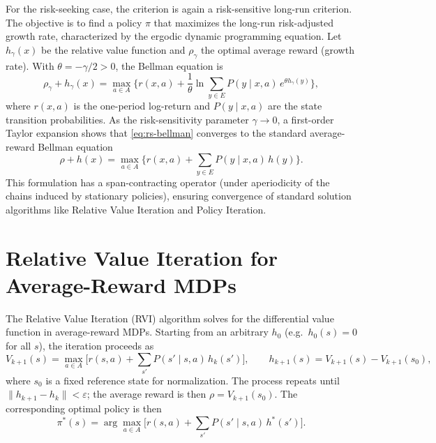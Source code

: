 \documentclass[11pt,a4paper]{article}
\begin{document}
For the risk-seeking case, the criterion is again a risk-sensitive long-run criterion. The objective is to find a policy $\pi$ that maximizes the long-run risk-adjusted growth rate, characterized by the ergodic dynamic programming equation. Let $h_\gamma(x)$ be the relative value function and $\rho_\gamma$ the optimal average reward (growth rate). With $\theta=-\gamma/2>0$, the Bellman equation is
\begin{equation}\label{eq:rs-bellman}
  \rho_\gamma+h_\gamma(x)=\max_{a\in A}\Big\{r(x,a)+\frac{1}{\theta}\ln\sum_{y\in E}P(y\mid x,a)\,e^{\theta h_\gamma(y)}\Big\},
\end{equation}
where $r(x,a)$ is the one-period log-return and $P(y\mid x,a)$ are the state transition probabilities. As the risk-sensitivity parameter $\gamma\to0$, a first-order Taylor expansion shows that \eqref{eq:rs-bellman} converges to the standard average-reward Bellman equation
\begin{equation}\label{eq:ar-bellman}
  \rho+h(x)=\max_{a\in A}\Big\{r(x,a)+\sum_{y\in E}P(y\mid x,a)\,h(y)\Big\}.
\end{equation}
This formulation has a span-contracting operator (under aperiodicity of the chains induced by stationary policies), ensuring convergence of standard solution algorithms like Relative Value Iteration and Policy Iteration.

\section{Relative Value Iteration for Average-Reward MDPs}

The Relative Value Iteration (RVI) algorithm solves for the differential value function in average-reward MDPs. Starting from an arbitrary $h_0$ (e.g.\ $h_0(s)=0$ for all $s$), the iteration proceeds as
\begin{equation}\label{eq:rvi}
  V_{k+1}(s)=\max_{a\in A}\Big[r(s,a)+\sum_{s'}P(s'\mid s,a)\,h_k(s')\Big],\qquad h_{k+1}(s)=V_{k+1}(s)-V_{k+1}(s_0),
\end{equation}
where $s_0$ is a fixed reference state for normalization. The process repeats until $\|h_{k+1}-h_k\|<\varepsilon$; the average reward is then $\rho=V_{k+1}(s_0)$. The corresponding optimal policy is then
\begin{equation}\label{eq:greedy}
  \pi^*(s)=\arg\max_{a\in A}\Big[r(s,a)+\sum_{s'}P(s'\mid s,a)\,h^*(s')\Big].
\end{equation}
\end{document}
